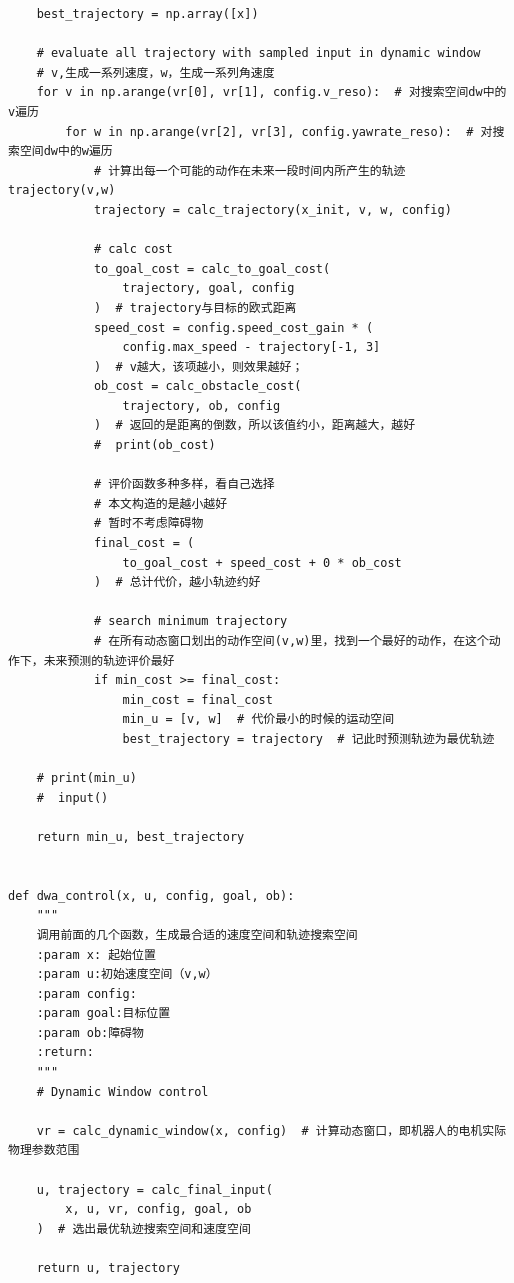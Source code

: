 \begin{verbatim}
    best_trajectory = np.array([x])

    # evaluate all trajectory with sampled input in dynamic window
    # v,生成一系列速度，w，生成一系列角速度
    for v in np.arange(vr[0], vr[1], config.v_reso):  # 对搜索空间dw中的v遍历
        for w in np.arange(vr[2], vr[3], config.yawrate_reso):  # 对搜索空间dw中的w遍历
            # 计算出每一个可能的动作在未来一段时间内所产生的轨迹trajectory(v,w)
            trajectory = calc_trajectory(x_init, v, w, config)

            # calc cost
            to_goal_cost = calc_to_goal_cost(
                trajectory, goal, config
            )  # trajectory与目标的欧式距离
            speed_cost = config.speed_cost_gain * (
                config.max_speed - trajectory[-1, 3]
            )  # v越大，该项越小，则效果越好；
            ob_cost = calc_obstacle_cost(
                trajectory, ob, config
            )  # 返回的是距离的倒数，所以该值约小，距离越大，越好
            #  print(ob_cost)

            # 评价函数多种多样，看自己选择
            # 本文构造的是越小越好
            # 暂时不考虑障碍物
            final_cost = (
                to_goal_cost + speed_cost + 0 * ob_cost
            )  # 总计代价，越小轨迹约好

            # search minimum trajectory
            # 在所有动态窗口划出的动作空间(v,w)里，找到一个最好的动作，在这个动作下，未来预测的轨迹评价最好
            if min_cost >= final_cost:
                min_cost = final_cost
                min_u = [v, w]  # 代价最小的时候的运动空间
                best_trajectory = trajectory  # 记此时预测轨迹为最优轨迹

    # print(min_u)
    #  input()

    return min_u, best_trajectory


def dwa_control(x, u, config, goal, ob):
    """
    调用前面的几个函数，生成最合适的速度空间和轨迹搜索空间
    :param x: 起始位置
    :param u:初始速度空间（v,w）
    :param config:
    :param goal:目标位置
    :param ob:障碍物
    :return:
    """
    # Dynamic Window control

    vr = calc_dynamic_window(x, config)  # 计算动态窗口，即机器人的电机实际物理参数范围

    u, trajectory = calc_final_input(
        x, u, vr, config, goal, ob
    )  # 选出最优轨迹搜索空间和速度空间

    return u, trajectory



\end{verbatim}
